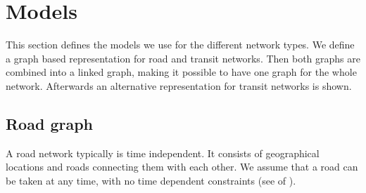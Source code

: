 \section{Models}\label{models}
	This section defines the models we use for the different network types. We define a graph
	based representation for road and transit networks. Then both graphs are combined
	into a linked graph, making it possible to have one graph for the whole network.
	Afterwards an alternative representation for transit networks is shown.
	
\subsection{Road graph}\label{roadGraphSec}
	A road network typically is time independent. It consists of geographical locations and roads connecting them with each other.
	We assume that a road can be taken at any time, with no time dependent constraints (see  of ).
	
